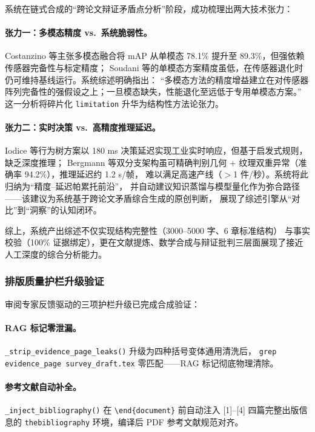 \documentclass[a4paper,11pt]{article}
\begin{document}
系统在链式合成的``跨论文辩证矛盾点分析''阶段，成功梳理出两大技术张力：

\paragraph{张力一：多模态精度 vs.\ 系统脆弱性。}
Costanzino 等主张多模态融合将 mAP 从单模态 78.1\% 提升至 89.3\%，但强依赖传感器完备性与标定精度；
Soudani 等的单模态方案精度虽低，在传感器退化时仍可维持基线运行。系统综述明确指出：
``多模态方法的精度增益建立在对传感器阵列完备性的强假设之上；一旦模态缺失，性能退化至远低于专用单模态方案。''
这一分析将碎片化 \texttt{limitation} 升华为结构性方法论张力。

\paragraph{张力二：实时决策 vs.\ 高精度推理延迟。}
Iodice 等行为树方案以 180 ms 决策延迟实现工业实时响应，但基于启发式规则，缺乏深度推理；
Bergmann 等双分支架构虽可精确判别几何 + 纹理双重异常（准确率 94.2\%），推理延迟约 1.2 s/帧，
难以满足高速产线（$>$1 件/秒）。系统将此归纳为``精度--延迟帕累托前沿''，
并自动建议知识蒸馏与模型量化作为弥合路径——该建议为系统基于跨论文矛盾综合生成的原创判断，
展现了综述引擎从``对比''到``洞察''的认知闭环。

综上，系统产出综述不仅实现结构完整性（3000--5000 字、6 章标准结构）
与事实校验（100\% 证据绑定），更在文献提炼、数学合成与辩证批判三层面展现了接近人工深度的综合分析能力。

\subsubsection{排版质量护栏升级验证}

审阅专家反馈驱动的三项护栏升级已完成合成验证：

\paragraph{RAG 标记零泄漏。}
\texttt{\_strip\_evidence\_page\_leaks()} 升级为四种括号变体通用清洗后，
\texttt{grep evidence\_page survey\_draft.tex} 零匹配——RAG 标记彻底物理清除。

\paragraph{参考文献自动补全。}
\texttt{\_inject\_bibliography()} 在 \texttt{\textbackslash end\{document\}} 前自动注入
[1]--[4] 四篇完整出版信息的 \texttt{thebibliography} 环境，编译后 PDF 参考文献规范对齐。
\end{document}
